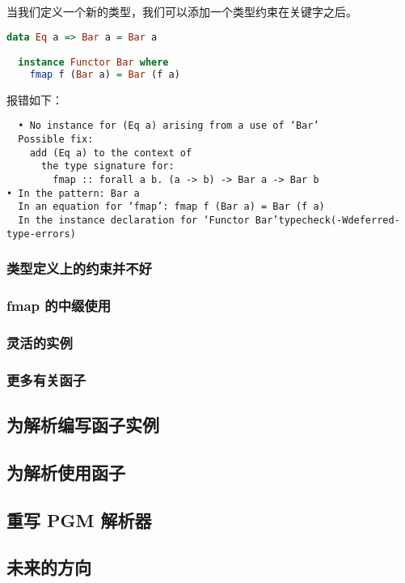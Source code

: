 \documentclass[./main.tex]{subfiles}
\begin{document}
当我们定义一个新的类型，我们可以添加一个类型约束在关键字之后。

\begin{lstlisting}[language=Haskell]
  data Eq a => Bar a = Bar a

  instance Functor Bar where
    fmap f (Bar a) = Bar (f a)
\end{lstlisting}

报错如下：

\begin{lstlisting}
  • No instance for (Eq a) arising from a use of ‘Bar’
  Possible fix:
    add (Eq a) to the context of
      the type signature for:
        fmap :: forall a b. (a -> b) -> Bar a -> Bar b
• In the pattern: Bar a
  In an equation for ‘fmap’: fmap f (Bar a) = Bar (f a)
  In the instance declaration for ‘Functor Bar’typecheck(-Wdeferred-type-errors)
\end{lstlisting}

\subsubsection*{类型定义上的约束并不好}


\subsubsection*{fmap 的中缀使用}

\subsubsection*{灵活的实例}

\subsubsection*{更多有关函子}

\subsection*{为解析编写函子实例}

\subsection*{为解析使用函子}

\subsection*{重写 PGM 解析器}

\subsection*{未来的方向}
\end{document}
